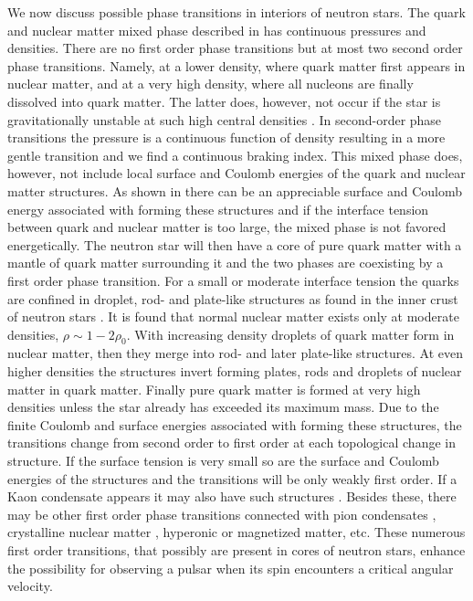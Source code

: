 \begin{multicols}{2}
We now discuss possible phase transitions in interiors of neutron
stars.  The quark and nuclear matter mixed phase described in
\cite{Glendenning} has continuous pressures and densities. There are
no first order phase transitions but at most two second order phase
transitions. Namely, at a lower density, where quark matter first
appears in nuclear matter, and at a very high density, where all
nucleons are finally dissolved into quark matter. The latter does,
however, not occur if the star is gravitationally unstable at such
high central densities \cite{star_properties,HPS}.  In second-order
phase transitions the pressure is a continuous function of density
resulting in a more gentle transition and we find a continuous braking
index.  This mixed phase does, however, not include local surface and
Coulomb energies of the quark and nuclear matter structures. As shown
in \cite{HPS,HH} there can be an appreciable surface and Coulomb
energy associated with forming these structures and if the interface
tension between quark and nuclear matter is too large, the mixed phase
is not favored energetically. The neutron star will then have a core
of pure quark matter with a mantle of quark matter surrounding it and
the two phases are coexisting by a first order phase transition.  For
a small or moderate interface tension the quarks are confined in
droplet, rod- and plate-like structures \cite{HPS,HH} as found in the
inner crust of neutron stars \cite{LPR}. It is found that normal
nuclear matter exists only at moderate densities, $\rho\sim
1-2\rho_0$.  With increasing density droplets of quark matter form in
nuclear matter, then they merge into rod- and later plate-like
structures.  At even higher densities the structures invert forming
plates, rods and droplets of nuclear matter in quark matter.  Finally
pure quark matter is formed at very high densities unless the star
already has exceeded its maximum mass.  Due to the finite Coulomb and
surface energies associated with forming these structures, the
transitions change from second order to first order at each
topological change in structure.  If the surface tension is very small
so are the surface and Coulomb energies of the structures and the
transitions will be only weakly first order.  If a Kaon condensate
appears it may also have such structures \cite{Schaffner}.  Besides
these, there may be other first order phase transitions connected with
pion condensates \cite{pion}, crystalline nuclear matter \cite{vijay},
hyperonic or magnetized matter, etc.  These numerous first order
transitions, that possibly are present in cores of neutron stars,
enhance the possibility for observing a pulsar when its spin
encounters a critical angular velocity.


\end{multicols}
